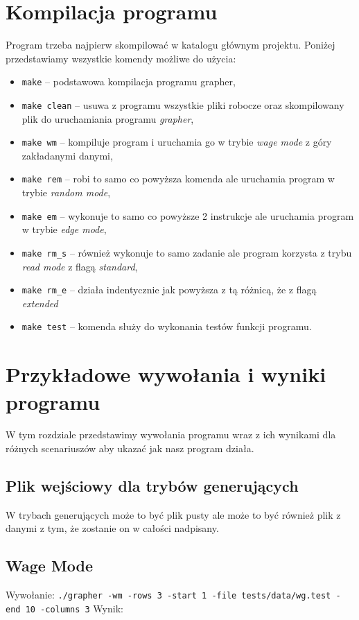 \documentclass[10pt, a4paper]{report}
\begin{document}
    \section{Kompilacja programu}
    Program trzeba najpierw skompilować w katalogu głównym projektu. Poniżej przedstawiamy wszystkie komendy możliwe do użycia:
    \begin{itemize}
        \item \texttt{make} -- podstawowa kompilacja programu grapher,
        \item \texttt{make clean} -- usuwa z programu wszystkie pliki robocze oraz skompilowany plik do uruchamiania programu \textit{grapher},
        \item \texttt{make wm} -- kompiluje program i uruchamia go w trybie \textit{wage mode} z góry zakładanymi danymi,
        \item \texttt{make rem} -- robi to samo co powyższa komenda ale uruchamia program w trybie \textit{random mode},
        \item \texttt{make em} -- wykonuje to samo co powyższe 2 instrukcje ale uruchamia program w trybie \textit{edge mode},
        \item \texttt{make rm\_s} -- również wykonuje to samo zadanie ale program korzysta z trybu \textit{read mode} z flagą \textit{standard},
        \item \texttt{make rm\_e} -- działa indentycznie jak powyższa z tą różnicą, że z flagą \textit{extended}
        \item \texttt{make test} -- komenda służy do wykonania testów funkcji programu.
    \end{itemize}

    \section{Przykładowe wywołania i wyniki programu}
    W tym rozdziale przedstawimy wywołania programu wraz z ich wynikami dla różnych scenariuszów aby ukazać jak nasz program działa.

    \subsection{Plik wejściowy dla trybów generujących}
    W trybach generujących może to być plik pusty ale może to być również plik z danymi z tym, że zostanie on w całości nadpisany.

    \subsection{Wage Mode}
    Wywołanie:
    \newline\newline \texttt{./grapher -wm -rows 3 -start 1 -file tests/data/wg.test -end 10 -columns 3}
    \newline\newline Wynik:
    
\end{document}
